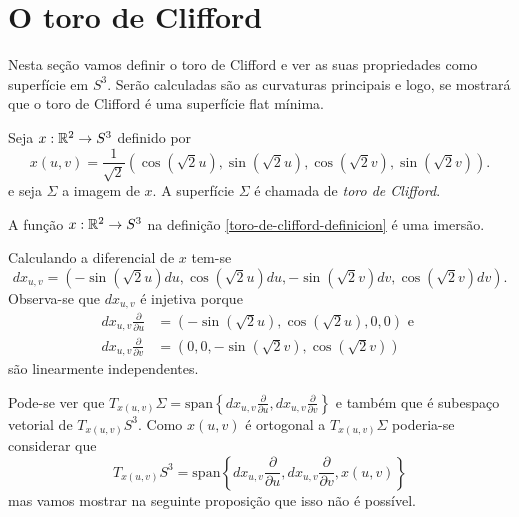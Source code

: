 %

\section{O toro de Clifford}

Nesta seção vamos definir o toro de Clifford e ver as suas propriedades como superfície em $S^3$. Serão calculadas são as curvaturas principais e logo, se mostrará que o toro de Clifford é uma superfície flat mínima.

\begin{definicao}\label{toro-de-clifford-definicion}
	Seja
	$x: \mathbb R^2 \rightarrow S^3$
	definido por
	\begin{equation*}
	x(u,v) = \frac{1}{\sqrt{2}} \left(\cos(\sqrt{2} u), \sin(\sqrt{2} u), \cos(\sqrt{2} v), \sin(\sqrt{2} v)\right).
	\end{equation*}
	e seja $\Sigma$ a imagem de $x$. A superfície $\Sigma$ é chamada de \emph{toro de Clifford}.
\end{definicao}

\begin{proposicao}
	A função $x: \mathbb R^2 \rightarrow S^3$ na definição \ref{toro-de-clifford-definicion} é uma imersão.
\end{proposicao}

\begin{demonstracao}
	Calculando a diferencial de $x$ tem-se
	\begin{equation*}
	dx_{u,v} = \left(-\sin(\sqrt{2} u) du, \cos(\sqrt{2} u) du, -\sin(\sqrt{2} v) dv, \cos(\sqrt{2} v) dv\right).
	\end{equation*}
	Observa-se que $dx_{u,v}$ é injetiva porque
	\begin{align*}
	dx_{u,v} \frac{\partial}{\partial u} &= \left(-\sin(\sqrt{2} u), \cos(\sqrt{2} u), 0, 0\right) \text{ e }\\
	dx_{u,v} \frac{\partial}{\partial v} &= \left(0, 0, -\sin(\sqrt{2} v), \cos(\sqrt{2} v)\right)
	\end{align*}
	são linearmente independentes.
\end{demonstracao}
Pode-se ver que
$T_{x(u,v)} \Sigma = \text{span} \left\{dx_{u,v} \frac{\partial}{\partial u}, dx_{u,v} \frac{\partial}{\partial v}\right\}$
e também que é subespaço vetorial de
$T_{x(u,v)} S^3$.
Como $x(u,v)$ é ortogonal a $T_{x(u,v)} \Sigma$ poderia-se considerar que
\begin{equation*}
	T_{x(u,v)} S^3 = \text{span} \left\{dx_{u,v} \frac{\partial}{\partial u}, dx_{u,v} \frac{\partial}{\partial v}, x(u,v)\right\}
\end{equation*}
mas vamos mostrar na seguinte proposição que isso não é possível.

